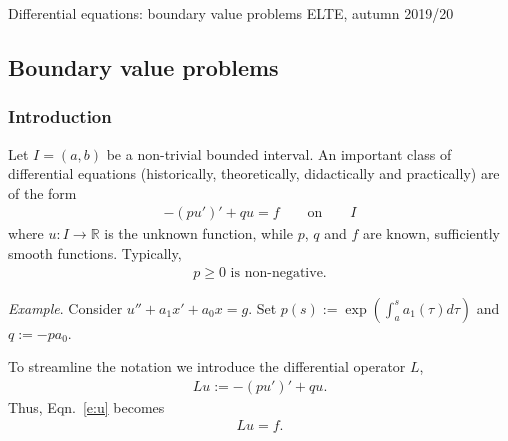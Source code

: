 \documentclass[12pt,a4paper]{article}
\newcommand{\from}{\colon}
\newcommand{\IR}{\mathbb{R}}
\begin{document}
    
    Differential equations: boundary value problems
    \hfill
    ELTE, autumn 2019/20
    
    \subsection*{Boundary value problems}
    
    \subsubsection*{Introduction}
    
    
    Let $I = (a, b)$ be a non-trivial bounded interval.
    An important class of differential equations
    (historically, theoretically, didactically and practically)
    are
    of the form
    \begin{align}
        \label{e:u}
        -(p u')' + q u = f
        \qquad\text{on}\qquad
        I
    \end{align}
    where 
    $u \from I \to \IR$
    is the unknown function,
    while $p$, $q$ and $f$ are known, sufficiently smooth functions.
    Typically, 
    \begin{align}
        \label{e:p0}
        \text{$p \geq 0$ is non-negative.}
    \end{align}

    
    \emph{Example}.
    Consider $u'' + a_1 x' + a_0 x = g$.
    Set $p(s) := \exp(\int_a^s a_1(\tau) d\tau)$
    and $q := -p a_0$.
    
    
    
    To streamline the notation we introduce 
    the differential operator $L$,
    \begin{align}
        \label{e:L}
        L u :=
        -(p u')' + q u
        .
    \end{align}
    Thus, Eqn.~\eqref{e:u} becomes
    \begin{align}
        \label{e:Lu}
        L u = f
        .
    \end{align}

    
    
\end{document}
